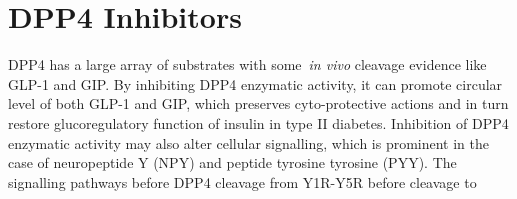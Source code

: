 \section{DPP4 Inhibitors}
DPP4 has a large array of substrates with some~\textit{in vivo} cleavage evidence like GLP-1 and GIP. By inhibiting DPP4 enzymatic activity, it can promote circular level of both GLP-1 and GIP, which preserves cyto-protective actions and in turn restore glucoregulatory function of insulin in type II diabetes. Inhibition of DPP4 enzymatic activity may also alter cellular signalling, which is prominent in the case of neuropeptide Y (NPY) and peptide tyrosine tyrosine (PYY). The signalling pathways before DPP4 cleavage from Y1R-Y5R before cleavage to 